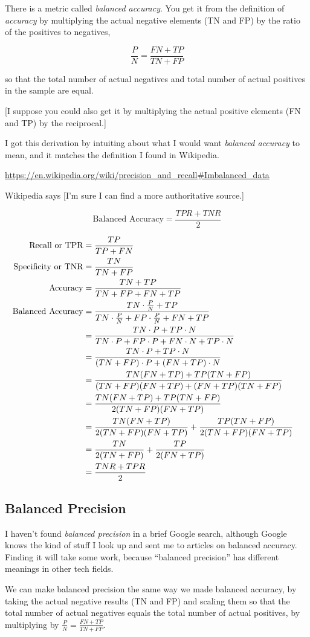 There is a metric called {\it balanced accuracy}.  You get it from the definition of {\it accuracy} by multiplying the actual negative elements (TN and FP) by the ratio of the positives to negatives, 

$$\frac{P}{N} = \frac{FN+TP}{TN+FP}$$

so that the total number of actual negatives and total number of actual positives in the sample are equal.

[I suppose you could also get it by multiplying the actual positive elements (FN and TP) by the reciprocal.]

I got this derivation by intuiting about what I would want {\it balanced accuracy} to mean, and it matches the definition I found in Wikipedia.  

\url{https://en.wikipedia.org/wiki/precision_and_recall#Imbalanced_data}

Wikipedia says [I'm sure I can find a more authoritative source.]

$$\text{Balanced Accuracy} = \frac{TPR + TNR}{2}$$

\begin{align*}
	\text{Recall or TPR} &= \frac{TP}{TP+FN} \cr
	\text{Specificity or TNR} &= \frac{TN}{TN+FP} \cr
	\text{Accuracy} &= \frac{TN+TP}{TN+FP+FN+TP} \cr
	\text{Balanced Accuracy} &=  \frac{TN \cdot \frac{P}{N}+TP}{TN \cdot \frac{P}{N}+FP \cdot \frac{P}{N}+FN+TP} \cr
		&= \frac{TN \cdot P+TP \cdot N}{TN \cdot P+FP \cdot P+FN \cdot N+TP\cdot N} \cr
	&= \frac{TN \cdot P+TP \cdot N}{(TN+FP) \cdot P+(FN+TP) \cdot  N} \cr
	&= \frac{TN (FN+TP)+TP (TN+FP)}{(TN+FP) (FN+TP)+(FN+TP) (TN+FP)} \cr
	&= \frac{TN (FN+TP)+TP (TN+FP)}{2(TN+FP) (FN+TP)} \cr
	&= \frac{TN (FN+TP)}{2(TN+FP) (FN+TP)}  + \frac{TP (TN+FP)}{2(TN+FP) (FN+TP)} \cr
	&= \frac{TN}{2(TN+FP) }  + \frac{TP }{2 (FN+TP)} \cr
	&= \frac{TNR+TPR}{2} \cr
\end{align*}

\subsection{Balanced Precision}

I haven't found {\it balanced precision} in a brief Google search, although Google knows the kind of stuff I look up and sent me to articles on balanced accuracy.  Finding it will take some work, because ``balanced precision'' has different meanings in other tech fields.  

We can make balanced precision the same way we made balanced accuracy, by taking the actual negative results (TN and FP) and scaling them  so that the total number of actual negatives equals the total number of actual positives, by multiplying by $\frac{P}{N} = \frac{FN+TP}{TN+FP}$.

